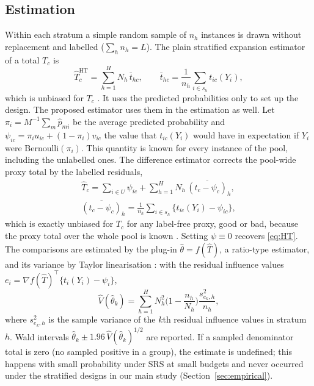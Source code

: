 \subsection{Estimation}\label{sec:estimation}
Within each stratum a simple random sample of $n_h$ instances is drawn without replacement and labelled ($\sum_h n_h=L$). The plain stratified expansion estimator of a total $T_c$ is
\begin{equation}\label{eq:HT}
\hat T^{\mathrm{HT}}_c=\sum_{h=1}^H N_h\,\bar t_{hc},\qquad \bar t_{hc}=\frac{1}{n_h}\sum_{i\in s_h} t_{ic}(Y_i),
\end{equation}
which is unbiased for $T_c$ \citep{cochran1977}. It uses the predicted probabilities only to set up the design. The proposed estimator uses them in the estimation as well. Let $\pi_i=M^{-1}\sum_m\hat p_{mi}$ be the average predicted probability and $\psi_{ic}=\pi_iu_{ic}+(1-\pi_i)v_{ic}$ the value that $t_{ic}(Y_i)$ would have in expectation if $Y_i$ were Bernoulli$(\pi_i)$. This quantity is known for every instance of the pool, including the unlabelled ones. The difference estimator corrects the pool-wide proxy total by the labelled residuals,
\begin{equation}\label{eq:DIF}
\begin{gathered}
\hat T_c=\sum_{i\in U}\psi_{ic}+\sum_{h=1}^H N_h\,\overline{(t_c-\psi_c)}_{h},\\
\overline{(t_c-\psi_c)}_{h}=\frac1{n_h}\sum_{i\in s_h}\{t_{ic}(Y_i)-\psi_{ic}\},
\end{gathered}
\end{equation}
which is exactly unbiased for $T_c$ for any label-free proxy, good or bad, because the proxy total over the whole pool is known \citep{cassel1976,sarndal1992}. Setting $\psi\equiv0$ recovers \eqref{eq:HT}. The comparisons are estimated by the plug-in $\hat\theta=f(\hat T)$, a ratio-type estimator, and its variance by Taylor linearisation \citep[Section~5.5]{sarndal1992}: with the residual influence values $e_i=\nabla f(\hat T)^{\top}\{t_i(Y_i)-\psi_i\}$,
\begin{equation}\label{eq:var}
\hat V(\hat\theta_k)=\sum_{h=1}^H N_h^2\Big(1-\frac{n_h}{N_h}\Big)\frac{s^2_{e_k,h}}{n_h},
\end{equation}
where $s^2_{e_k,h}$ is the sample variance of the $k$th residual influence values in stratum $h$. Wald intervals $\hat\theta_k\pm 1.96\,\hat V(\hat\theta_k)^{1/2}$ are reported. If a sampled denominator total is zero (no sampled positive in a group), the estimate is undefined; this happens with small probability under SRS at small budgets and never occurred under the stratified designs in our main study (Section~\ref{sec:empirical}).

